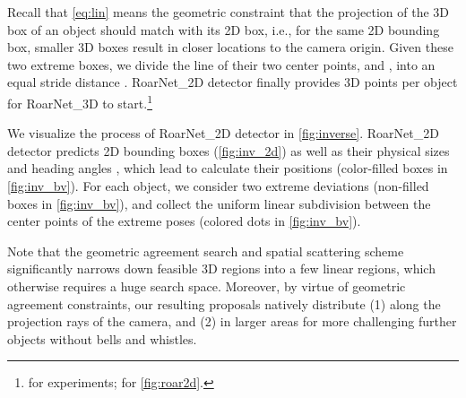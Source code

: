 \documentclass[letterpaper, 10 pt, conference]{ieeeconf}
\begin{document}
Recall that \cref{eq:lin} means the geometric constraint that the projection of the 3D box of an object should match with its 2D box, i.e., for the same 2D bounding box, smaller 3D boxes result in closer locations to the camera origin. Given these two extreme boxes, we divide the line of their two center points,  and , into an equal stride distance . RoarNet\_2D detector finally provides  3D points per object for RoarNet\_3D to start.\footnote{ for experiments;  for \cref{fig:roar2d}.}

We visualize the process of RoarNet\_2D detector in \cref{fig:inverse}. RoarNet\_2D detector predicts 2D bounding boxes (\cref{fig:inv_2d}) as well as their physical sizes  and heading angles , which lead to calculate their positions  (color-filled boxes in \cref{fig:inv_bv}). For each object, we consider two extreme deviations (non-filled boxes in \cref{fig:inv_bv}), and collect the uniform linear subdivision between the center points of the extreme poses (colored dots in \cref{fig:inv_bv}).

Note that the geometric agreement search and spatial scattering scheme significantly narrows down feasible 3D regions into a few linear regions, which otherwise requires a huge search space. Moreover, by virtue of geometric agreement constraints, our resulting proposals natively distribute (1) along the projection rays of the camera, and (2) in larger areas for more challenging further objects without bells and whistles.
\end{document}
